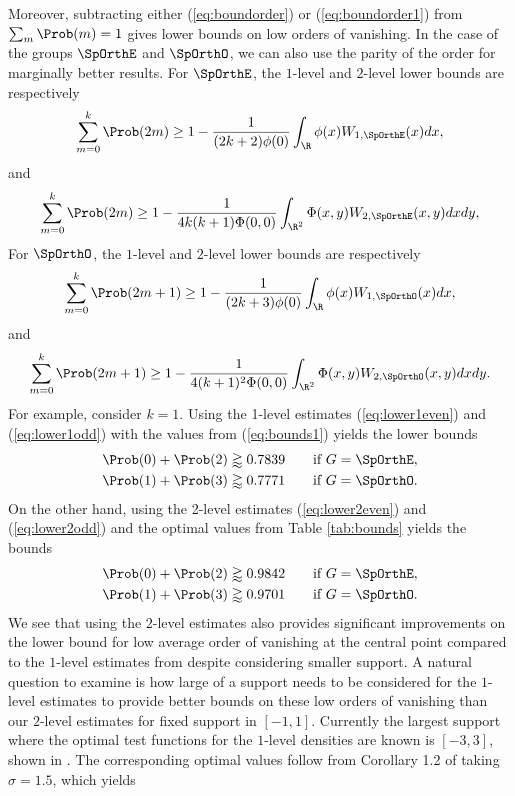 \documentclass[12pt, reqno]{amsart}
\numberwithin{equation}{section}
\theoremstyle{definition}
\theoremstyle{remark}
\begin{document}
Moreover, subtracting either (\ref{eq:boundorder}) or (\ref{eq:boundorder1}) from $\sum_m \Prob(m) = 1$ gives lower bounds on low orders of vanishing. In the case of the groups $\SpOrthE$ and $\SpOrthO$, we can also use the parity of the order for marginally better results. For $\SpOrthE$, the $1$-level and $2$-level lower bounds are respectively
\begin{equation}
	\sum_{m = 0}^k \Prob(2m) \geq 1 -  \frac{1}{(2k + 2)\phi(0)} \int_\R \phi(x) W_{1, \SpOrthE} (x) dx, \label{eq:lower1even}
\end{equation}
and
\begin{equation}
	\sum_{m = 0}^k \Prob(2m) \geq 1 -  \frac{1}{4 k(k + 1)\Phi(0, 0)} \int_{\R^2} \Phi(x, y) W_{2, \SpOrthE} (x, y) dx dy, \label{eq:lower2even}
\end{equation}
For $\SpOrthO$, the $1$-level and $2$-level lower bounds are respectively
\begin{equation}
	\sum_{m = 0}^k \Prob(2m + 1) \geq 1 -  \frac{1}{(2k + 3)\phi(0)} \int_\R \phi(x) W_{1, \SpOrthO} (x) dx, \label{eq:lower1odd}
\end{equation}
and
\begin{equation}
	\sum_{m = 0}^k \Prob(2m + 1) \geq 1 -  \frac{1}{4 (k + 1)^2\Phi(0, 0)} \int_{\R^2} \Phi(x, y) W_{2, \SpOrthO} (x, y) dx dy. \label{eq:lower2odd}
\end{equation}
For example, consider $k = 1$. Using the 1-level estimates (\ref{eq:lower1even}) and (\ref{eq:lower1odd}) with the values from (\ref{eq:bounds1}) yields the lower bounds
\begin{align}
	\Prob(0) + \Prob(2) &\gtrapprox 0.7839 \qquad \text{if } G = \SpOrthE,\\
	\Prob(1) + \Prob(3) &\gtrapprox 0.7771 \qquad \text{if } G = \SpOrthO.
\end{align}
On the other hand, using the 2-level estimates (\ref{eq:lower2even}) and (\ref{eq:lower2odd}) and the optimal values from Table \ref{tab:bounds} yields the bounds
\begin{align}
	\Prob(0) + \Prob(2) &\gtrapprox 0.9842 \qquad \text{if } G = \SpOrthE \label{eq:lower2evenbound},\\
	\Prob(1) + \Prob(3) &\gtrapprox 0.9701 \qquad \text{if } G = \SpOrthO.\label{eq:lower2oddbound}
\end{align}
We see that using the $2$-level estimates also provides significant improvements on the lower bound for low average order of vanishing at the central point compared to the $1$-level estimates from \cite{ILS} despite considering smaller support. A natural question to examine is how large of a support needs to be considered for the $1$-level estimates to provide better bounds on these low orders of vanishing than our $2$-level estimates for fixed support in $[-1, 1]$. Currently the largest support where the optimal test functions for the $1$-level densities are known is $[-3, 3]$, shown in \cite{FreemanMiller, FreemanThesis}. The corresponding optimal values follow from Corollary 1.2 of \cite{FreemanMiller} taking $\sigma = 1.5$, which yields
\end{document}
